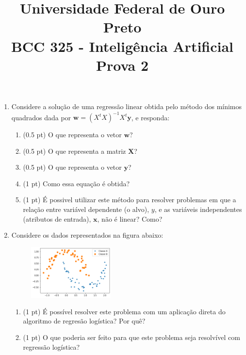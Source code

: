 \documentclass{article}
\title{\vspace{-2 cm} Universidade Federal de Ouro Preto \\ BCC 325 - Inteligência Artificial \\ Prova 2}
\date{}
\begin{document}
\maketitle

\vspace{-2 cm}
\begin{enumerate}

\item Considere a solução de uma regressão linear obtida pelo método dos mínimos quadrados dada por $\mathbf{w} = (X^{t}X)^{-1}X^t\mathbf{y}$, e responda:
\begin{enumerate}
    \item (0.5 pt) O que representa o vetor $\mathbf{w}$?
    \item (0.5 pt) O que representa a matriz $\mathbf{X}$?
    \item (0.5 pt) O que representa o vetor $\mathbf{y}$?
    \item (1 pt) Como essa equação é obtida?
    \item (1 pt) É possivel utilizar este método para resolver problemas em que a relação entre variável dependente (o alvo), $y$, e as variáveis independentes (atributos de entrada), $\mathbf{x}$, não é linear? Como?  
\end{enumerate}

\item Considere os dados representados na figura abaixo:

    \begin{figure}[!ht]
        \centering
        \includegraphics[width=0.41\textwidth]{moons.png}
    \end{figure}
    
    \begin{enumerate}
        \item (1 pt) É possível resolver este problema com um aplicação direta do algoritmo de regresão logística? Por quê?
        \item (1 pt) O que poderia ser feito para que este problema seja resolvível com regressão logística?
    \end{enumerate}


\end{enumerate}
\end{document}
